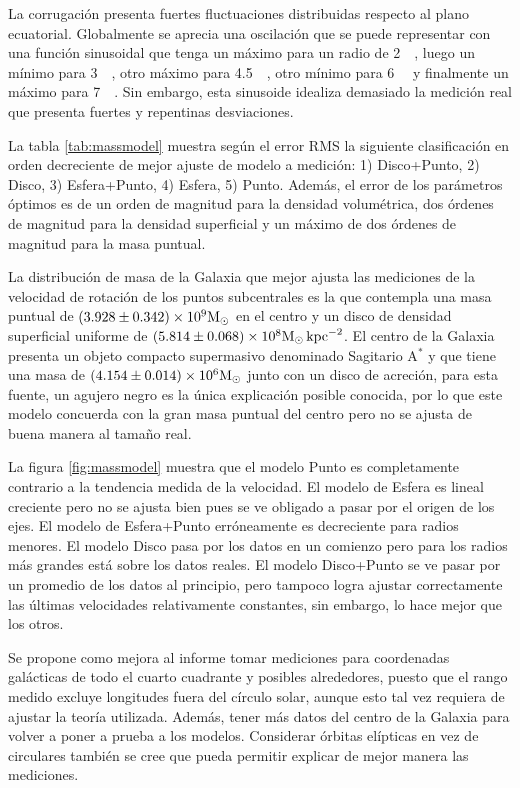 La corrugación presenta fuertes fluctuaciones distribuidas respecto al plano ecuatorial. Globalmente se aprecia una oscilación que se puede representar con una función sinusoidal que tenga un máximo para un radio de \SI{2}{\kilo\parsec}, luego un mínimo para \SI{3}{\kilo\parsec}, otro máximo para \SI{4.5}{\kilo\parsec}, otro mínimo para \SI{6}{\kilo\parsec} y finalmente un máximo para \SI{7}{\kilo\parsec}. Sin embargo, esta sinusoide idealiza demasiado la medición real que presenta fuertes y repentinas desviaciones.

La tabla \ref{tab:massmodel} muestra según el error RMS la siguiente clasificación en orden decreciente de mejor ajuste de modelo a medición: 1) Disco+Punto, 2) Disco, 3) Esfera+Punto, 4) Esfera, 5) Punto. Además, el error de los parámetros óptimos es de un orden de magnitud para la densidad volumétrica, dos órdenes de magnitud para la densidad superficial y un máximo de dos órdenes de magnitud para la masa puntual.

La distribución de masa de la Galaxia que mejor ajusta las mediciones de la velocidad de rotación de los puntos subcentrales es la que contempla una masa puntual de $(3.928\pm0.342)\times10^9\textnormal{M}_\odot$ en el centro y un disco de densidad superficial uniforme de $(5.814\pm0.068)\times10^8\textnormal{M}_\odot\,\textnormal{kpc}^{-2}$. El centro de la Galaxia presenta un objeto compacto supermasivo denominado Sagitario A$^\ast$ y que tiene una masa de $(4.154\pm0.014)\times10^6\textnormal{M}_\odot$ junto con un disco de acreción, para esta fuente, un agujero negro es la única explicación posible conocida, por lo que este modelo concuerda con la gran masa puntual del centro pero no se ajusta de buena manera al tamaño real.

La figura \ref{fig:massmodel} muestra que el modelo Punto es completamente contrario a la tendencia medida de la velocidad. El modelo de Esfera es lineal creciente pero no se ajusta bien pues se ve obligado a pasar por el origen de los ejes. El modelo de Esfera+Punto erróneamente es decreciente para radios menores. El modelo Disco pasa por los datos en un comienzo pero para los radios más grandes está sobre los datos reales. El modelo Disco+Punto se ve pasar por un promedio de los datos al principio, pero tampoco logra ajustar correctamente las últimas velocidades relativamente constantes, sin embargo, lo hace mejor que los otros.

Se propone como mejora al informe tomar mediciones para coordenadas galácticas de todo el cuarto cuadrante y posibles alrededores, puesto que el rango medido excluye longitudes fuera del círculo solar, aunque esto tal vez requiera de ajustar la teoría utilizada. Además, tener más datos del centro de la Galaxia para volver a poner a prueba a los modelos. Considerar órbitas elípticas en vez de circulares también se cree que pueda permitir explicar de mejor manera las mediciones.

